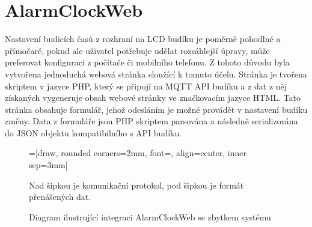 \section{AlarmClockWeb}
Nastavení budicích časů z rozhraní na LCD budíku je poměrně pohodlné
a přímočaré, pokud ale uživatel potřebuje udělat rozsáhlejší úpravy, může
preferovat konfiguraci z počítače či mobilního telefonu.
Z tohoto důvodu byla vytvořena jednoduchá webová stránka sloužící k tomuto
účelu. Stránka je tvořena skriptem v jazyce PHP, který se připojí na MQTT API
budíku a z dat z něj získaných vygeneruje obsah webové stránky ve značkovacím
jazyce HTML. Tato stránka obsahuje formulář, jehož odesláním je možné provádět
v nastavení budíku změny. Data z formuláře jsou PHP skriptem parsována
a následně serializována do JSON objektu kompatibilního s API budíku.


\begin{figure}[htbp]
    \centering
    =[draw, rounded corners=2mm, font={\bfseries}, align=center, inner sep=3mm]

    {\footnotesize Nad šipkou je komunikační protokol, pod šipkou je formát
    přenášených dat.}
    \caption{Diagram ilustrující integraci AlarmClockWeb se zbytkem systému}
    \label{fig:web blok}
\end{figure}


